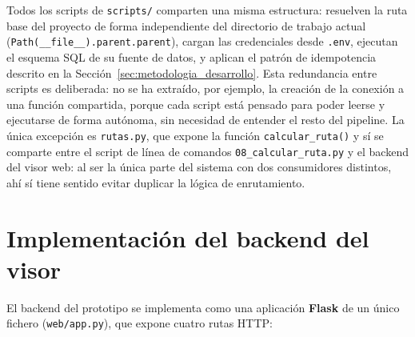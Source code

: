 \begin{sloppypar}
Todos los scripts de \texttt{scripts/} comparten una misma estructura: resuelven la ruta base del proyecto de forma independiente del directorio de trabajo actual (\texttt{Path(\_\_file\_\_).parent.parent}), cargan las credenciales desde \texttt{.env}, ejecutan el esquema SQL de su fuente de datos, y aplican el patrón de idempotencia descrito en la Sección~\ref{sec:metodologia_desarrollo}. Esta redundancia entre scripts es deliberada: no se ha extraído, por ejemplo, la creación de la conexión a una función compartida, porque cada script está pensado para poder leerse y ejecutarse de forma autónoma, sin necesidad de entender el resto del pipeline. La única excepción es \texttt{rutas.py}, que expone la función \texttt{calcular\_ruta()} y sí se comparte entre el script de línea de comandos \texttt{08\_calcular\_ruta.py} y el backend del visor web: al ser la única parte del sistema con dos consumidores distintos, ahí sí tiene sentido evitar duplicar la lógica de enrutamiento.
\end{sloppypar}

\section{Implementación del backend del visor}
\label{sec:backend_visor}

El backend del prototipo se implementa como una aplicación \textbf{Flask} \cite{grinberg2018} de un único fichero (\texttt{web/app.py}), que expone cuatro rutas HTTP:

